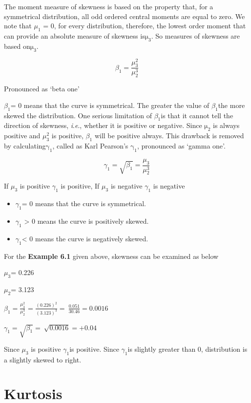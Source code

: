 \documentclass[
]{book}
\begin{document}
The moment measure of skewness is based on the property that, for a
symmetrical distribution, all odd ordered central moments are equal to
zero. We note that \(\mu_{1}\) = 0, for every distribution, therefore, the
lowest order moment that can provide an absolute measure of skewness
is\(\text{μ}_{3}\). So measures of skewness are based
on\(\text{μ}_{3}\).

\[\beta_{1} = \frac{\mu_{3}^{2}}{\mu_{2}^{3}}\]

Pronounced as `beta one'

\(\beta_{1}\)= 0 means that the curve is symmetrical. The greater the
value of \(\beta_{1}\)the more skewed the distribution. One serious
limitation of \(\beta_{1}\)is that it cannot tell the direction of
skewness, \emph{i}.\emph{e}., whether it is positive or negative. Since
\(\text{μ}_{2}\) is always positive and \(\mu_{3}^{2}\) is positive,
\(\beta_{1}\) will be positive always. This drawback is removed by
calculating\(\text{γ}_{1}\), called as Karl Pearson's\(\text{ γ}_{1}\),
pronounced as `gamma one'.

\[\gamma_{1} = \sqrt{\beta_{1}} = \frac{\mu_{3}}{\mu_{2}^{3}}\]

If \(\mu_{3}\) is positive \(\gamma_{1}\) is positive, If \(\mu_{3}\) is
negative \(\gamma_{1}\) is negative

\begin{itemize}
\item
  \(\gamma_{1}\)= 0 means that the curve is symmetrical.
\item
  \(\gamma_{1}\) \textgreater{} 0 means the curve is positively skewed.
\item
  \(\gamma_{1}\)\textless{} 0 means the curve is negatively skewed.
\end{itemize}

For the \textbf{Example 6.1} given above, skewness can be examined as below

\(\mu_{3}\)= 0.226

\(\mu_{2}\)= 3.123

\(\beta_{1} = \frac{\mu_{3}^{2}}{\mu_{2}^{3}}\) =
\(\frac{\left( 0.226 \right)^{2}}{\left( 3.123 \right)^{3}} = \ \frac{0.051}{30.46} = 0.0016\)

\(\gamma_{1} = \sqrt{\beta_{1}} = \ \sqrt{0.0016} = + 0.04\)

Since \(\mu_{3}\) is positive \(\gamma_{1}\)is positive. Since
\(\gamma_{1}\)is slightly greater than 0, distribution is a slightly
skewed to right.

\hypertarget{kurtosis}{%
\section{Kurtosis}\label{kurtosis}}
\end{document}
